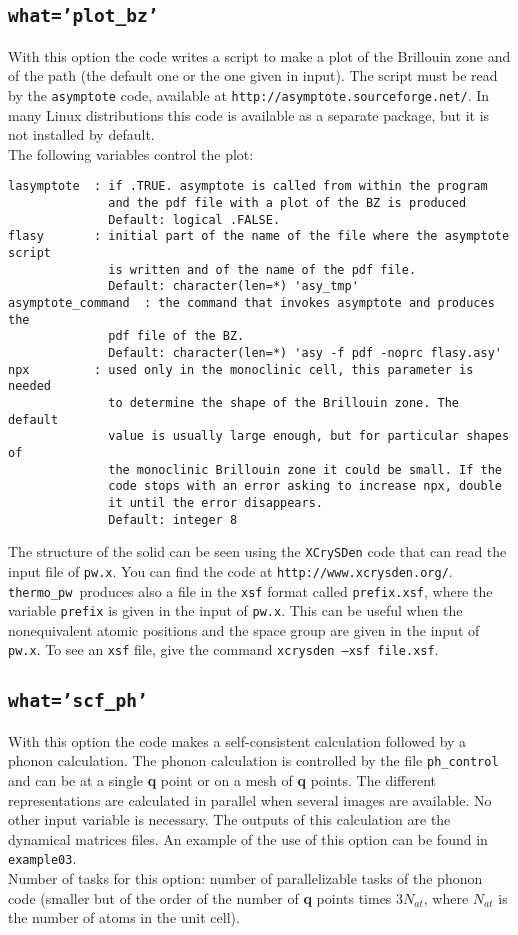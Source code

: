 \documentclass[12pt,a4paper]{article}
\def\thermo{\texttt{thermo\_pw}}
\begin{document}
\subsection{\texttt{what='plot\_bz'}}
With this option the code writes a script to make a plot
of the Brillouin zone and of the path (the default one or the one given in 
input). 
The script must be read by the \texttt{asymptote} code, available at 
\texttt{http://asymptote.sourceforge.net/}. In many Linux distributions
this code is available as a separate package, but it is not installed by
default. \\
The following variables control the plot:
\begin{verbatim}
lasymptote  : if .TRUE. asymptote is called from within the program
              and the pdf file with a plot of the BZ is produced
              Default: logical .FALSE.
flasy       : initial part of the name of the file where the asymptote script
              is written and of the name of the pdf file.
              Default: character(len=*) 'asy_tmp'
asymptote_command  : the command that invokes asymptote and produces the 
              pdf file of the BZ.
              Default: character(len=*) 'asy -f pdf -noprc flasy.asy'
npx         : used only in the monoclinic cell, this parameter is needed
              to determine the shape of the Brillouin zone. The default
              value is usually large enough, but for particular shapes of
              the monoclinic Brillouin zone it could be small. If the
              code stops with an error asking to increase npx, double 
              it until the error disappears.
              Default: integer 8
\end{verbatim}
The structure of the solid can be seen using the \texttt{XCrySDen} code
that can read the input file of \texttt{pw.x}. You can find the code at
\texttt{http://www.xcrysden.org/}. \thermo\ produces also a file in the
\texttt{xsf} format called \texttt{prefix.xsf}, where the variable 
\texttt{prefix}
is given in the input of \texttt{pw.x}. This can be useful when
the nonequivalent atomic positions and the space group are given in the input
of \texttt{pw.x}. To see an \texttt{xsf} file, give the command
\texttt{xcrysden --xsf file.xsf}.

\subsection{\texttt{what='scf\_ph'}}
With this option the code makes a self-consistent calculation followed
by a phonon calculation. The phonon calculation is controlled by the file
\texttt{ph\_control} and can be at a single {\bf q} point or on a mesh of 
{\bf q} points. 
The different representations are calculated in parallel when several images 
are available. No other input variable is necessary. The outputs of this 
calculation are the dynamical matrices files.
An example of the use of this option can be found in \texttt{example03}. \\
Number of tasks for this option: number of parallelizable tasks of the 
phonon code (smaller but of the order of the number of {\bf q} points times 
$3 N_{at}$, where $N_{at}$ is the number of atoms in the unit cell).
\end{document}
